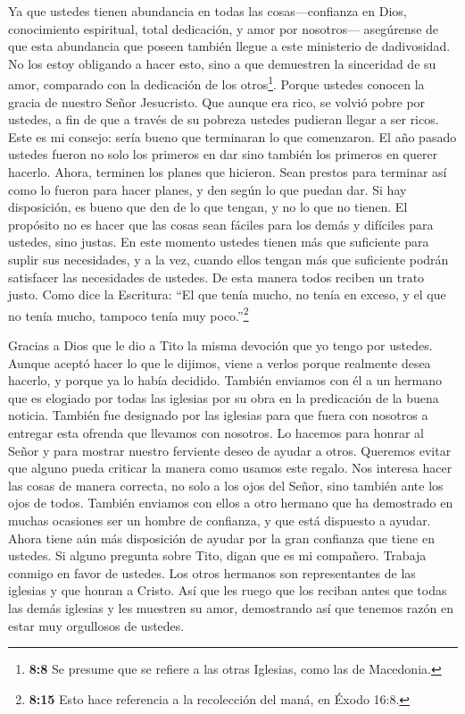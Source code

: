  Ya que ustedes tienen abundancia en todas las
cosas---confianza en Dios, conocimiento espiritual, total dedicación, y
amor por nosotros--- asegúrense de que esta abundancia que poseen
también llegue a este ministerio de dadivosidad.  No los
estoy obligando a hacer esto, sino a que demuestren la sinceridad de su
amor, comparado con la dedicación de los otros\footnote{\textbf{8:8} Se
  presume que se refiere a las otras Iglesias, como las de Macedonia.}.
 Porque ustedes conocen la gracia de nuestro Señor
Jesucristo. Que aunque era rico, se volvió pobre por ustedes, a fin de
que a través de su pobreza ustedes pudieran llegar a ser ricos.
 Este es mi consejo: sería bueno que terminaran lo que
comenzaron. El año pasado ustedes fueron no solo los primeros en dar
sino también los primeros en querer hacerlo.  Ahora,
terminen los planes que hicieron. Sean prestos para terminar así como lo
fueron para hacer planes, y den según lo que puedan dar. 
Si hay disposición, es bueno que den de lo que tengan, y no lo que no
tienen.  El propósito no es hacer que las cosas sean
fáciles para los demás y difíciles para ustedes, sino justas.
 En este momento ustedes tienen más que suficiente para
suplir sus necesidades, y a la vez, cuando ellos tengan más que
suficiente podrán satisfacer las necesidades de ustedes. De esta manera
todos reciben un trato justo.  Como dice la Escritura: ``El
que tenía mucho, no tenía en exceso, y el que no tenía mucho, tampoco
tenía muy poco.''\footnote{\textbf{8:15} Esto hace referencia a la
  recolección del maná, en Éxodo 16:8.}

 Gracias a Dios que le dio a Tito la misma devoción que yo
tengo por ustedes.  Aunque aceptó hacer lo que le dijimos,
viene a verlos porque realmente desea hacerlo, y porque ya lo había
decidido.  También enviamos con él a un hermano que es
elogiado por todas las iglesias por su obra en la predicación de la
buena noticia.  También fue designado por las iglesias para
que fuera con nosotros a entregar esta ofrenda que llevamos con
nosotros. Lo hacemos para honrar al Señor y para mostrar nuestro
ferviente deseo de ayudar a otros.  Queremos evitar que
alguno pueda criticar la manera como usamos este regalo. 
Nos interesa hacer las cosas de manera correcta, no solo a los ojos del
Señor, sino también ante los ojos de todos.  También
enviamos con ellos a otro hermano que ha demostrado en muchas ocasiones
ser un hombre de confianza, y que está dispuesto a ayudar. Ahora tiene
aún más disposición de ayudar por la gran confianza que tiene en
ustedes.  Si alguno pregunta sobre Tito, digan que es mi
compañero. Trabaja conmigo en favor de ustedes. Los otros hermanos son
representantes de las iglesias y que honran a Cristo.  Así
que les ruego que los reciban antes que todas las demás iglesias y les
muestren su amor, demostrando así que tenemos razón en estar muy
orgullosos de ustedes.

